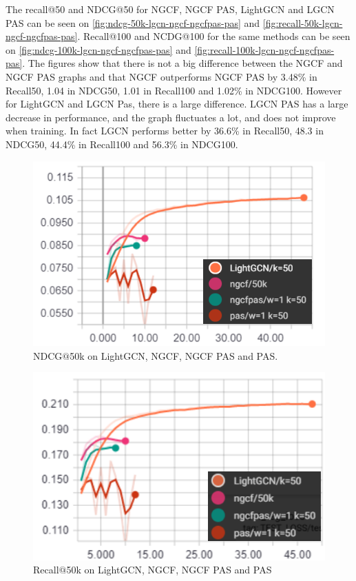 The recall@50 and NDCG@50 for NGCF, NGCF PAS, LightGCN and LGCN PAS can be seen on \autoref{fig:ndcg-50k-lgcn-ngcf-ngcfpas-pas} and \autoref{fig:recall-50k-lgcn-ngcf-ngcfpas-pas}.
Recall@100 and NCDG@100 for the same methods can be seen on \autoref{fig:ndcg-100k-lgcn-ngcf-ngcfpas-pas} and \autoref{fig:recall-100k-lgcn-ngcf-ngcfpas-pas}.
The figures show that there is not a big difference between the NGCF and NGCF PAS graphs and that NGCF outperforms NGCF PAS by 3.48\% in Recall\@50, 1.04 in NDCG\@50, 1.01 in Recall\@100 and 1.02\% in NDCG\@100.
However for LightGCN and LGCN Pas, there is a large difference.
LGCN PAS has a large decrease in performance, and the graph fluctuates a lot, and does not improve when training.
In fact LGCN performs better by 36.6\% in Recall\@50, 48.3 in NDCG\@50, 44.4\% in Recall\@100 and 56.3\% in NDCG\@100.
\begin{figure}
    \includegraphics[width=\linewidth]{figures/graphs/ndcg-50k-lgcn-ngcf-ngcfpas-pas.png}
    \caption{NDCG$@$50k on LightGCN, NGCF, NGCF PAS and PAS.}
    \label{fig:ndcg-50k-lgcn-ngcf-ngcfpas-pas}
\end{figure}

\begin{figure}
    \includegraphics[width=\linewidth]{figures/graphs/recall-50k-lgcn-ngcf-ngcfpas-pas.png}
    \caption{Recall$@$50k on LightGCN, NGCF, NGCF PAS and PAS}
    \label{fig:recall-50k-lgcn-ngcf-ngcfpas-pas}
\end{figure}

